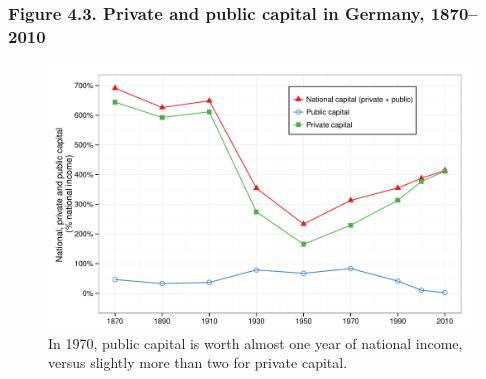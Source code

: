 \documentclass[t]{beamer}\usepackage[]{graphicx}\usepackage[]{color}
\newenvironment{knitrout}{}{} %
\begin{document}
\begin{frame}[label=Figure_4_3]
\frametitle{Figure 4.3. Private and public capital in Germany, 1870--2010}
\begin{figure}[t]
\begin{minipage}[b]{\textwidth}
\centering
\begin{knitrout}\footnotesize
{}\color{fgcolor}

{\centering \includegraphics[width=1\linewidth]{figures/color/Figure_4_3} 

}



\end{knitrout}
\caption{In 1970, public capital is worth almost one year of national income, versus slightly more than two for private capital.}
\end{minipage}
\end{figure}
\end{frame}
\end{document}
